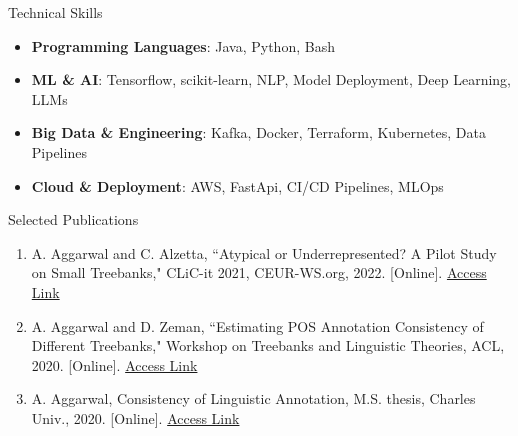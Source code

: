 \documentclass{resume} %
\begin{document}
\begin{rSection}{Technical Skills}
    \begin{itemize}
        \item \textbf{Programming Languages}: Java, Python, Bash
        \item \textbf{ML \& AI}: Tensorflow, scikit-learn, NLP, Model Deployment, Deep Learning, LLMs
        \item \textbf{Big Data \& Engineering}: Kafka, Docker, Terraform, Kubernetes, Data Pipelines
        \item \textbf{Cloud \& Deployment}: AWS, FastApi, CI/CD Pipelines, MLOps
    \end{itemize}
\end{rSection}

\begin{rSection}{Selected Publications}
    \begin{enumerate}
        \item A. Aggarwal and C. Alzetta, ``Atypical or Underrepresented? A Pilot Study on Small Treebanks," CLiC-it 2021, CEUR-WS.org, 2022. [Online]. {\href{http://ceur-ws.org/Vol-3033/paper78.pdf}{Access Link}}
        \item A. Aggarwal and D. Zeman, ``Estimating POS Annotation Consistency of Different Treebanks," Workshop on Treebanks and Linguistic Theories, ACL, 2020. [Online]. \href{https://www.aclweb.org/anthology/2020.tlt-1.9}{Access Link}
        \item A. Aggarwal, Consistency of Linguistic Annotation, M.S. thesis, Charles Univ., 2020. [Online]. \href{https://dspace.cuni.cz/handle/20.500.11956/120867}{Access Link}
    \end{enumerate}
\end{rSection}
\end{document}
